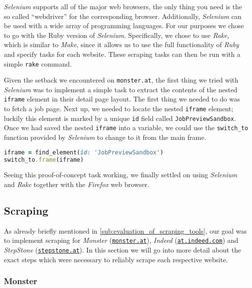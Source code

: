 \documentclass[runningheads]{llncs}
\begin{document}
\textit{Selenium} supports all of the major web browsers, the only thing you need is the so called “webdriver” for the corresponding browser. Additionally, \textit{Selenium} can be used with a wide array of programming languages. For our purposes we chose to go with the Ruby version of \textit{Selenium}. Specifically, we chose to use \textit{Rake}, which is similar to \textit{Make}, since it allows us to use the full functionality of \textit{Ruby} and specify tasks for each website. These scraping tasks can then be run with a simple \texttt{rake} command.

Given the setback we encountered on \texttt{monster.at}, the first thing we tried with \textit{Selenium} was to implement a simple task to extract the contents of the nested \texttt{iframe} element in their detail page layout. The first thing we needed to do was to fetch a job page. Next up, we needed to locate the nested \texttt{iframe} element; luckily this element is marked by a unique \texttt{id} field called \texttt{JobPreviewSandbox}. Once we had saved the nested \texttt{iframe} into a variable, we could use the \texttt{switch\_to} function provided by \textit{Selenium} to change to it from the main frame.

\begin{lstlisting}[language=Ruby]
iframe = find_element(id: 'JobPreviewSandbox')
switch_to.frame(iframe)
\end{lstlisting}

Seeing this proof-of-concept task working, we finally settled on using \textit{Selenium} and \textit{Rake} together with the \textit{Firefox} web browser.

\subsection{Scraping}
\label{sub:scraping}

As already briefly mentioned in \autoref{sub:evaluation_of_scraping_tools}, our goal was to implement scraping for \textit{Monster} (\href{https://www.monster.at/}{\texttt{monster.at}}), \textit{Indeed} (\href{https://at.indeed.com/}{\texttt{at.indeed.com}}) and \textit{StepStone} (\href{https://www.stepstone.at/}{\texttt{stepstone.at}}). In this section we will go into more detail about the exact steps which were necessary to reliably scrape each respective website.

\subsubsection{Monster}
\label{subsub:monster}
\end{document}
